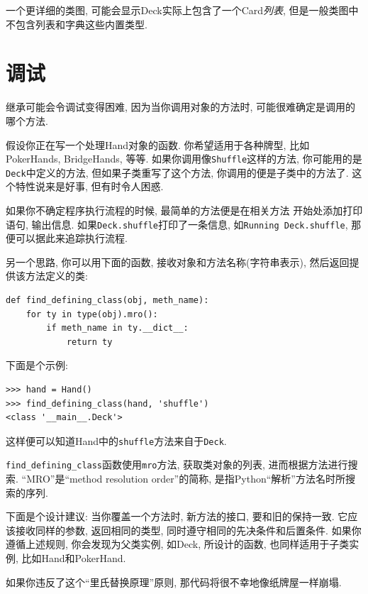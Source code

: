 \documentclass[10pt]{book}
\begin{document}
一个更详细的类图, 可能会显示Deck实际上包含了一个Card{\em 列表}, 
但是一般类图中不包含列表和字典这些内置类型. 

\section{调试}

继承可能会令调试变得困难, 因为当你调用对象的方法时, 
可能很难确定是调用的哪个方法. 

假设你正在写一个处理Hand对象的函数. 
你希望适用于各种牌型, 比如PokerHands, BridgeHands, 等等. 
如果你调用像{\tt Shuffle}这样的方法, 
你可能用的是{\tt Deck}中定义的方法, 
但如果子类重写了这个方法, 
你调用的便是子类中的方法了. 
这个特性说来是好事, 但有时令人困惑. 

如果你不确定程序执行流程的时候, 最简单的方法便是在相关方法
开始处添加打印语句, 输出信息. 
如果{\tt Deck.shuffle}打印了一条信息, 如{\tt Running Deck.shuffle}, 
那便可以据此来追踪执行流程. 

另一个思路, 你可以用下面的函数, 接收对象和方法名称(字符串表示), 
然后返回提供该方法定义的类:

\begin{verbatim}
def find_defining_class(obj, meth_name):
    for ty in type(obj).mro():
        if meth_name in ty.__dict__:
            return ty
\end{verbatim}
%
下面是个示例:

\begin{verbatim}
>>> hand = Hand()
>>> find_defining_class(hand, 'shuffle')
<class '__main__.Deck'>
\end{verbatim}
%
这样便可以知道Hand中的{\tt shuffle}方法来自于{\tt Deck}.

\verb"find_defining_class"函数使用{\tt mro}方法, 获取类对象的列表, 
进而根据方法进行搜索. 
``MRO''是``method resolution order''的简称, 
是指Python``解析''方法名时所搜索的序列.

下面是个设计建议: 当你覆盖一个方法时, 
新方法的接口, 要和旧的保持一致. 
它应该接收同样的参数, 返回相同的类型, 
同时遵守相同的先决条件和后置条件. 
如果你遵循上述规则, 你会发现为父类实例, 如Deck, 所设计的函数, 
也同样适用于子类实例, 比如Hand和PokerHand. 


如果你违反了这个``里氏替换原理''原则, 
那代码将很不幸地像纸牌屋一样崩塌. 
\end{document}
